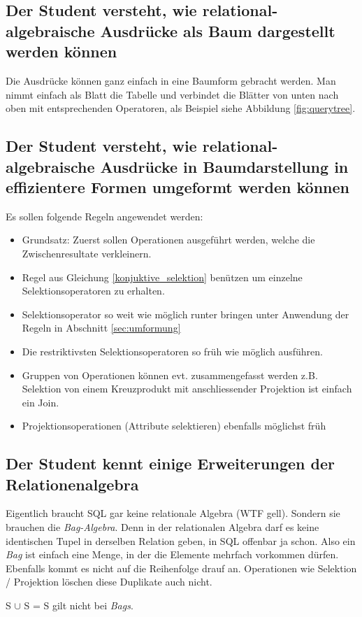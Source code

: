 \subsection{Der Student versteht, wie relational-algebraische Ausdrücke als Baum dargestellt werden können}
\label{sec:anfragebaum}

Die Ausdrücke können ganz einfach in eine Baumform gebracht werden. Man nimmt einfach als Blatt die Tabelle und verbindet die Blätter von unten nach oben mit entsprechenden Operatoren, als Beispiel siehe Abbildung \ref{fig:querytree}.


\subsection{Der Student versteht, wie relational-algebraische Ausdrücke in Baumdarstellung in effizientere Formen umgeformt werden können}

Es sollen folgende Regeln angewendet werden:

\begin{itemize}
  \item Grundsatz: Zuerst sollen Operationen ausgeführt werden, welche die Zwischenresultate verkleinern.
  \item Regel aus Gleichung \ref{konjuktive_selektion} benützen um einzelne Selektionsoperatoren zu erhalten.
  \item Selektionsoperator so weit wie möglich runter bringen unter Anwendung der Regeln in Abschnitt \ref{sec:umformung}
  \item Die restriktivsten Selektionsoperatoren so früh wie möglich ausführen.
  \item Gruppen von Operationen können evt. zusammengefasst werden z.B. Selektion von einem Kreuzprodukt mit anschliessender Projektion ist einfach ein Join.
  \item Projektionsoperationen (Attribute selektieren) ebenfalls möglichst früh
\end{itemize}

\subsection{Der Student kennt einige Erweiterungen der Relationenalgebra}
Eigentlich braucht SQL gar keine relationale Algebra (WTF gell). Sondern sie brauchen die \emph{Bag-Algebra}. Denn in der relationalen Algebra darf es keine identischen Tupel in derselben Relation geben, in SQL offenbar ja schon. Also ein \emph{Bag} ist einfach eine Menge, in der die Elemente mehrfach vorkommen dürfen. Ebenfalls kommt es nicht auf die Reihenfolge drauf an. Operationen wie Selektion / Projektion löschen diese Duplikate auch nicht.

S \(\cup\) S = S gilt nicht bei \emph{Bags}.